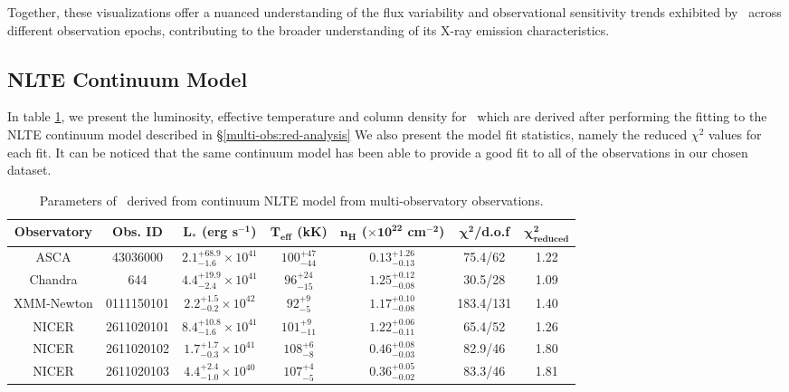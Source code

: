 		    Together, these visualizations offer a nuanced understanding of the flux variability and observational sensitivity trends exhibited by \source\ across different observation epochs, contributing to the broader understanding of its X-ray emission characteristics.
    	
    	\begin{landscape}
    	\subsection{NLTE Continuum Model} \label{multi-obs:results:nlte}
    		In table \ref{tab:res-fitting}, we present the luminosity, effective temperature and column density for \source\ which are derived after performing the fitting to the NLTE continuum model described in \S \ref{multi-obs:red-analysis} We also present the model fit statistics, namely the reduced $\chi^2$ values for each fit. It can be noticed that the same continuum model has been able to provide a good fit to all of the observations in our chosen dataset.
    		
    		\renewcommand{\arraystretch}{2.2}
    		\begin{table}[!htb]
		    	\centering
		    	\caption{Parameters of \source\ derived from continuum NLTE model from multi-observatory observations.}
		    	\label{tab:res-fitting}
		    	\begin{tabular}{ccccccc}
					\hline
					{\textbf{Observatory}} & {\textbf{Obs. ID}} & {$\boldsymbol{L_*}$ \textbf{(erg s$\boldsymbol{^{-1}}$)}} & {\textbf{$\boldsymbol{T_\text{eff}}$ (kK)}} & {\textbf{$\boldsymbol{n_H}$ ($\boldsymbol{\times 10^{22}}$ cm$\boldsymbol{^{-2}}$)}} & {$\boldsymbol{\chi^2}$/\textbf{d.o.f}} & {$\boldsymbol{\chi^2_\text{reduced}}$} \\
					\hline
					{ASCA} & {43036000} & {$2.1_{-1.6}^{+68.9}\times 10^{41}$} & {$100_{-44}^{+47}$} & {$0.13_{-0.13}^{+1.26}$} & {75.4/62} & {1.22} \\ %
					{Chandra} & {644} & {$4.4_{-2.4}^{+19.9}\times 10^{41}$} & {$96_{-15}^{+24}$} & {$1.25_{-0.08}^{+0.12}$} & {30.5/28} & {1.09} \\ %
					{XMM-Newton} & {0111150101} & {$2.2_{-0.2}^{+1.5}\times 10^{42}$} & {$92_{-5}^{+9}$} & {$1.17_{-0.08}^{+0.10}$} & {183.4/131} & {1.40} \\ %
					{NICER} & {2611020101} & {$8.4_{-1.6}^{+10.8}\times 10^{41}$} & {$101_{-11}^{+9}$} & {$1.22_{-0.11}^{+0.06}$} & {65.4/52} & {1.26} \\ %
					{NICER} & {2611020102} & {$1.7_{-0.3}^{+1.7}\times 10^{41}$} & {$108_{-8}^{+6}$} & {$0.46_{-0.03}^{+0.08}$} & {82.9/46} & {1.80} \\ %
					{NICER} & {2611020103} & {$4.4_{-1.0}^{+2.4}\times 10^{40}$} & {$107_{-5}^{+4}$} & {$0.36_{-0.02}^{+0.05}$} & {83.3/46} & {1.81} \\ %
					\hline
				\end{tabular}
			\end{table}
			\renewcommand{\arraystretch}{1.6}
			\end{landscape}
    	
